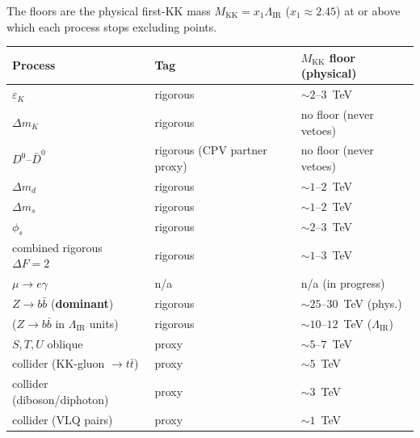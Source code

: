 \documentclass[11pt]{article}
\newcommand{\MKK}{M_{\mathrm{KK}}}
\newcommand{\LIR}{\Lambda_{\mathrm{IR}}}
\begin{document}
\noindent The floors are the physical first-KK mass $\MKK=x_1\LIR$
($x_1\approx2.45$) at or above which each process stops excluding points.
\smallskip
\begin{center}
\small
\begin{tabular}{
  >{\raggedright\arraybackslash}p{}
  >{\raggedright\arraybackslash}p{}
  >{\raggedright\arraybackslash}p{}}
\toprule
Process & Tag & $\MKK$ floor (physical) \\
\midrule
$\varepsilon_K$        & rigorous & $\sim2$--$3$~TeV  \\
$\Delta m_K$           & rigorous & no floor (never vetoes) \\
$D^0$--$\bar D^0$      & rigorous (CPV partner proxy) & no floor (never vetoes) \\
$\Delta m_d$           & rigorous & $\sim1$--$2$~TeV  \\
$\Delta m_s$           & rigorous & $\sim1$--$2$~TeV  \\
$\phi_s$               & rigorous & $\sim2$--$3$~TeV  \\
combined rigorous $\Delta F=2$ & rigorous & $\sim1$--$3$~TeV \\
$\mu\to e\gamma$       & n/a & n/a (in progress) \\
$Z\to b\bar b$ (\textbf{dominant}) & rigorous & $\sim25$--$30$~TeV (phys.) \\
\quad ($Z\to b\bar b$ in $\LIR$ units) & rigorous & $\sim10$--$12$~TeV ($\LIR$) \\
$S,T,U$ oblique        & proxy & $\sim5$--$7$~TeV  \\
collider (KK-gluon $\to t\bar t$) & proxy & $\sim5$~TeV \\
collider (diboson/diphoton) & proxy & $\sim3$~TeV \\
collider (VLQ pairs)   & proxy & $\sim1$~TeV \\
\bottomrule
\end{tabular}
\end{center}
\end{document}
